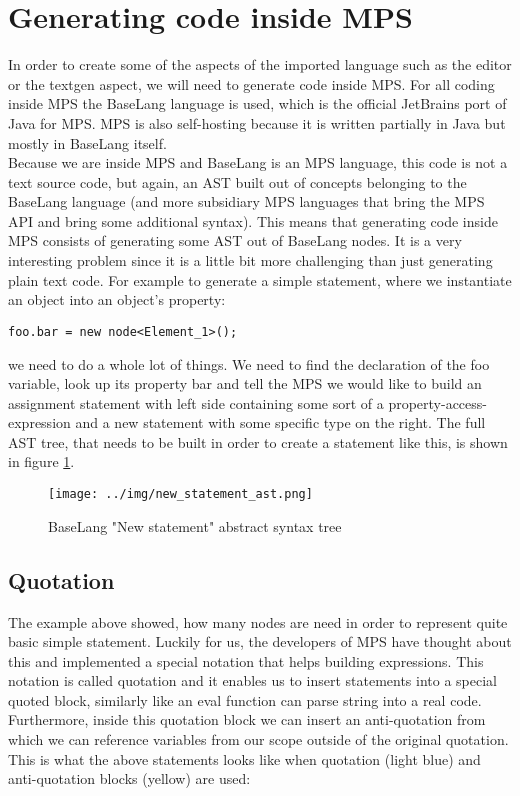 \section{Generating code inside MPS}
\label{chap:generating_code_inside_mps}

In order to create some of the aspects of the imported language such as the editor or the textgen aspect, we will need to generate code inside MPS. For all coding inside MPS the BaseLang language is used, which is the official JetBrains port of Java for MPS. MPS is also self-hosting because it is written partially in Java but mostly in BaseLang itself.
\\

Because we are inside MPS and BaseLang is an MPS language, this code is not a text source code, but again, an AST built out of concepts belonging to the BaseLang language (and more subsidiary MPS languages that bring the MPS API and bring some additional syntax). This means that generating code inside MPS consists of generating some AST out of BaseLang nodes. It is a very interesting problem since it is a little bit more challenging than just generating plain text code. For example to generate a simple statement, where we instantiate an object into an object's property:

\begin{center}
	\texttt{foo.bar = new node<Element{\_}1>();}
\end{center}

\noindent
we need to do a whole lot of things. We need to find the declaration of the foo variable, look up its property bar and tell the MPS we would like to build an assignment statement with left side containing some sort of a property-access-expression and a new statement with some specific type on the right. The full AST tree, that needs to be built in order to create a statement like this, is shown in figure \ref{fig:new_ast}.

\begin{figure}[hb]
	\centering
	\hspace*{-18mm}
	\texttt{[image: ../img/new\_statement\_ast.png]}
	\caption{BaseLang "New statement" abstract syntax tree}
	\label{fig:new_ast}
\end{figure}

\subsection{Quotation}
The example above showed, how many nodes are need in order to represent quite basic simple statement. Luckily for us, the developers of MPS have thought about this and implemented a special notation that helps building expressions. This notation is called quotation and it enables us to insert statements into a special quoted block, similarly like an eval function can parse string into a real code. Furthermore, inside this quotation block we can insert an anti-quotation from which we can reference variables from our scope outside of the original quotation. This is what the above statements looks like when quotation (light blue) and anti-quotation blocks (yellow) are used:

